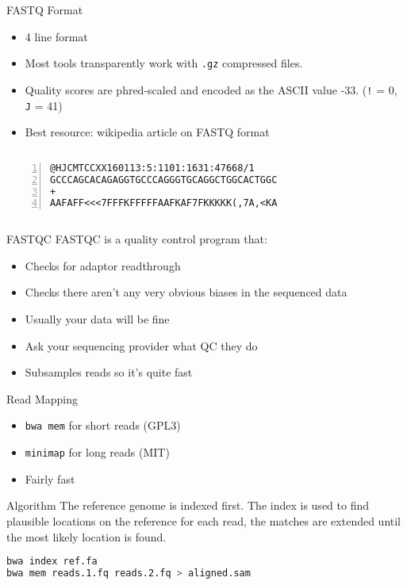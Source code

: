 \documentclass{beamer}
\begin{document}
\begin{frame}[fragile]{FASTQ Format}
	\begin{itemize}
		\item 4 line format
		\item Most tools transparently work with \texttt{.gz} compressed files.
		\item Quality scores are phred-scaled and encoded as the ASCII value -33. (\texttt{!} = 0, \texttt{J} = 41)
		\item Best resource: wikipedia article on FASTQ format
	\end{itemize}
		\begin{columns}
		\begin{lstlisting}[frame = single, numbers = left]
@HJCMTCCXX160113:5:1101:1631:47668/1
GCCCAGCACAGAGGTGCCCAGGGTGCAGGCTGGCACTGGC
+
AAFAFF<<<7FFFKFFFFFAAFKAF7FKKKKK(,7A,<KA
		\end{lstlisting}
	\end{columns}
\end{frame}

\begin{frame}{FASTQC}
FASTQC is a quality control program that:
	\begin{itemize}
		\item Checks for adaptor readthrough
		\item Checks there aren't any very obvious biases in the sequenced data
		\item Usually your data will be fine
		\item Ask your sequencing provider what QC they do
		\item Subsamples reads so it's quite fast
	\end{itemize}
\end{frame}

\begin{frame}[fragile]{Read Mapping}
	\begin{itemize}
		\item \texttt{bwa mem} for short reads (GPL3)
		\item \texttt{minimap} for long reads (MIT)
		\item Fairly fast
	\end{itemize}
	\begin{exampleblock}{Algorithm}
	The reference genome is indexed first. The index is used to find plausible locations on the reference for each read, the matches are extended until the most likely location is found.
	\end{exampleblock}
	\begin{lstlisting}[language = bash, frame = single]
bwa index ref.fa
bwa mem reads.1.fq reads.2.fq > aligned.sam
	\end{lstlisting}
\end{frame}
\end{document}
